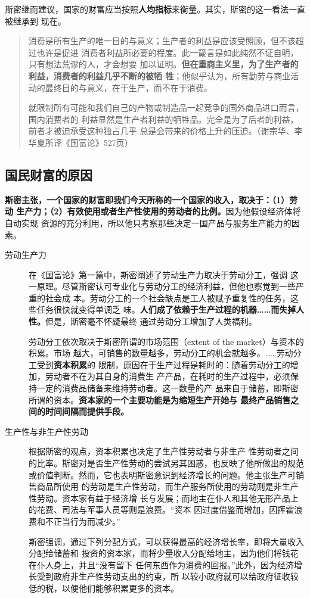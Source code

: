 斯密继而建议，国家的财富应当按照\textbf{人均指标}来衡量。其实，斯密的这一看法一直被继承到
现在。

\begin{quotation}
  消费是所有生产的唯一目的与意义；生产者的利益是应该受照顾，但不该超过也许是促进
  消费者利益所必要的程度。此一箴言是如此纯然不证自明，只有想法荒谬的人，才会想要
  加以证明。\textbf{但在重商主义里，为了生产者的利益，消费者的利益几乎不断的被牺
    牲}；他似乎认为，所有勤劳与商业活动的最终目的与意义，在于生产，而不在于消费。

  就限制所有可能和我们自己的产物或制造品一起竞争的国外商品进口而言，国内消费者的
  利益显然是生产者利益的牺牲品。完全是为了后者的利益，前者才被迫承受这种独占几乎
  总是会带来的价格上升的压迫。（谢宗华、李华夏所译《国富论》527页）
\end{quotation}

\subsection{国民财富的原因}

\textbf{斯密主张，一个国家的财富即我们今天所称的一个国家的收入，取决于：（1）劳动
  生产力；（2）有效使用或者生产性使用的劳动者的比例。}因为他假设经济体将自动实现
资源的充分利用，所以他只考察那些决定一国产品与服务生产能力的因素。

\begin{description}
\item [劳动生产力] 在《国富论》第一篇中，斯密阐述了劳动生产力取决于劳动分工，强调
  这一原理。尽管斯密认可专业化与劳动分工的经济利益，但他也察觉到一些严重的社会成
  本。劳动分工的一个社会缺点是工人被赋予重复性的任务，这些任务很快就变得单调乏
  味。\textbf{人们成了依赖于生产过程的机器……而失掉人性。}但是，斯密毫不怀疑最终
  通过劳动分工增加了人类福利。

  劳动分工依次取决于斯密所谓的市场范围（extent of the market）与资本的积累。市场
  越大，可销售的数量越多，劳动分工的机会就越多。……劳动分工受到\textbf{资本积累}的
  限制，原因在于生产过程是耗时的：随着劳动分工的增加，劳动者不在为其自身的消费生
  产产品，在耗时的生产过程中，必须保持一定的消费品储备来维持劳动者。这一数量的产
  品来自于储蓄，即斯密所谓的资本。\textbf{资本家的一个主要功能是为缩短生产开始与
    最终产品销售之间的时间间隔而提供手段。}

\item[生产性与非生产性劳动] 根据斯密的观点，资本积累也决定了生产性劳动者与非生产
  性劳动者之间的比率。斯密对是否生产性劳动的尝试另其困惑，也反映了他所做出的规范
  或价值判断。然而，它也表明斯密意识到经济增长的问题。他主张生产可销售商品所使用
  的劳动是生产性劳动，而生产服务所使用的劳动则是非生产性劳动。资本家有益于经济增
  长与发展；而地主在仆人和其他无形产品上的花费、司法与军事人员等则是浪费。“资本
  因过度借鉴而增加，因挥霍浪费和不正当行为而减少。”

  斯密强调，通过下列分配方式，可以获得最高的经济增长率，即将大量收入分配给储蓄和
  投资的资本家，而将少量收入分配给地主，因为他们将钱花在仆人身上，并且“没有留下
  任何东西作为消费的回报。”此外，因为经济增长受到政府非生产性劳动支出的约束，所
  以较小政府就可以给政府征收较低的税，以便他们能够积累更多的资本。
\end{description}

